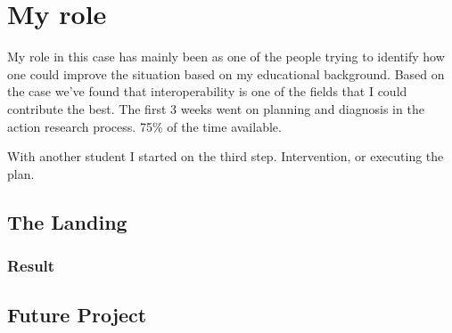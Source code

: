 \section{My role}
My role in this case has mainly been as one of the people trying to identify how one could improve the situation based on my educational background.
Based on the case we've found that interoperability is one of the fields that I could contribute the best.
The first 3 weeks went on planning and diagnosis in the action research process. 75\% of the time available. 

With another student I started on the third step. Intervention, or executing the plan.

\subsection{The Landing}
\subsubsection{Result}
\subsection{Future Project}